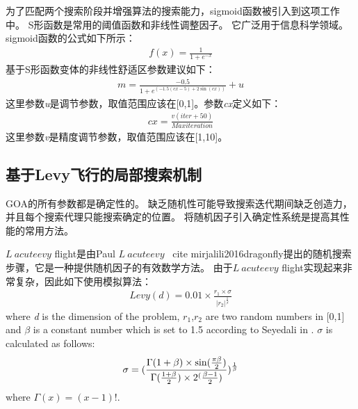 为了匹配两个搜索阶段并增强算法的搜索能力，sigmoid函数被引入到这项工作中。 S形函数是常用的阈值函数和非线性调整因子。 它广泛用于信息科学领域。 sigmoid函数的公式如下所示：
\begin{eqnarray}
	f(x)=\frac{1}{1+e^{-x}}
\end{eqnarray}
基于S形函数变体的非线性舒适区参数建议如下：
\begin{eqnarray}
    m=\frac{-0.5}{1+e^{(-1.5(cx-5)+2\sin(cx))}}+u
\end{eqnarray}
这里参数\emph{u}是调节参数，取值范围应该在[0,1]。参数\emph{cx}定义如下：
\begin{eqnarray}
	cx=\frac{v(iter+50)}{Maxiteration}
\end{eqnarray}
这里参数\emph{v}是精度调节参数，取值范围应该在[1,10]。
\subsection{基于Levy飞行的局部搜索机制}
GOA的所有参数都是确定性的。 缺乏随机性可能导致搜索迭代期间缺乏创造力，并且每个搜索代理只能搜索确定的位置。 将随机因子引入确定性系统是提高其性能的常用方法。

$ L \ acute {e} vy $ flight是由Paul $ L \ acute {e} vy $ \ cite {mirjalili2016dragonfly}提出的随机搜索步骤，它是一种提供随机因子的有效数学方法。 由于$ L \ acute {e} vy $ flight实现起来非常复杂，因此如下使用模拟算法：
\begin{eqnarray}
	Levy(d)=0.01\times\frac{r_1\times\sigma}{|r_2|^{\frac{1}{\beta}}}
\end{eqnarray}
where \emph{d} is the dimension of the problem, $r_1$,$r_2$ are two random numbers in [0,1] and $\beta$ is a constant number which is set to 1.5 according to Seyedali in \cite{mirjalili2016dragonfly}. $\sigma$ is calculated as follows:
\begin{eqnarray}
	\sigma=(\frac{\Gamma(1+\beta)\times \sin(\frac{\pi\beta}{2})}{\Gamma(\frac{1+\beta}{2})\time\beta\times2^(\frac{\beta-1}{2})})^\frac{1}{\beta}
\end{eqnarray}
where $\Gamma(x)=(x-1)!$.

